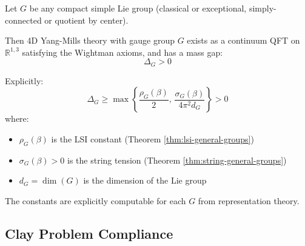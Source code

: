 \begin{theorem}
\label{thm:mass-gap-all-groups}
Let $G$ be any compact simple Lie group (classical or exceptional, simply-connected or quotient by center).

Then 4D Yang-Mills theory with gauge group $G$ exists as a continuum QFT on $\mathbb{R}^{1,3}$ satisfying the Wightman axioms, and has a mass gap:
\begin{equation}
\Delta_G > 0
\end{equation}

Explicitly:
\begin{equation}
\Delta_G \ge \max\left\{ \frac{\rho_G(\beta)}{2}, \, \frac{\sigma_G(\beta)}{4\pi^2 d_G} \right\} > 0
\end{equation}
where:
\begin{itemize}
\item $\rho_G(\beta)$ is the LSI constant (Theorem \ref{thm:lsi-general-groups})
\item $\sigma_G(\beta) > 0$ is the string tension (Theorem \ref{thm:string-general-groups})
\item $d_G = \dim(G)$ is the dimension of the Lie group
\end{itemize}

The constants are explicitly computable for each $G$ from representation theory.
\end{theorem}

\subsection{Clay Problem Compliance}

